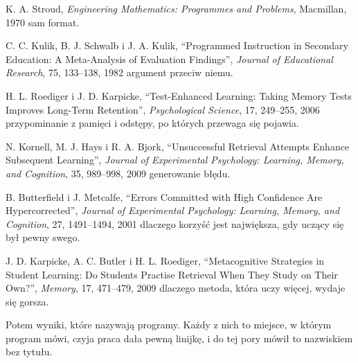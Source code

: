 \begin{reslist}
\item K. A. Stroud, \emph{Engineering Mathematics: Programmes and Problems},
  Macmillan, 1970 \dash{} sam format.
\item C. C. Kulik, B. J. Schwalb i J. A. Kulik, \enquote{Programmed
  Instruction in Secondary Education: A Meta-Analysis of Evaluation Findings},
  \emph{Journal of Educational Research}, 75, 133--138, 1982 \dash{} argument
  przeciw niemu.
\item H. L. Roediger i J. D. Karpicke, \enquote{Test-Enhanced Learning:
  Taking Memory Tests Improves Long-Term Retention}, \emph{Psychological
  Science}, 17, 249--255, 2006 \dash{} przypominanie z pamięci i odstępy, po
  których przewaga się pojawia.
\item N. Kornell, M. J. Hays i R. A. Bjork, \enquote{Unsuccessful Retrieval
  Attempts Enhance Subsequent Learning}, \emph{Journal of Experimental
  Psychology: Learning, Memory, and Cognition}, 35, 989--998, 2009 \dash{}
  generowanie błędu.
\item B. Butterfield i J. Metcalfe, \enquote{Errors Committed with High
  Confidence Are Hypercorrected}, \emph{Journal of Experimental Psychology:
  Learning, Memory, and Cognition}, 27, 1491--1494, 2001 \dash{} dlaczego
  korzyść jest największa, gdy uczący się był pewny swego.
\item J. D. Karpicke, A. C. Butler i H. L. Roediger, \enquote{Metacognitive
  Strategies in Student Learning: Do Students Practise Retrieval When They
  Study on Their Own?}, \emph{Memory}, 17, 471--479, 2009 \dash{} dlaczego
  metoda, która uczy więcej, wydaje się gorsza.
\end{reslist}

\medskip
Potem wyniki, które nazywają programy. Każdy z nich to miejsce, w którym
program mówi, czyja praca dała pewną linijkę, i do tej pory mówił to nazwiskiem
bez tytułu.

